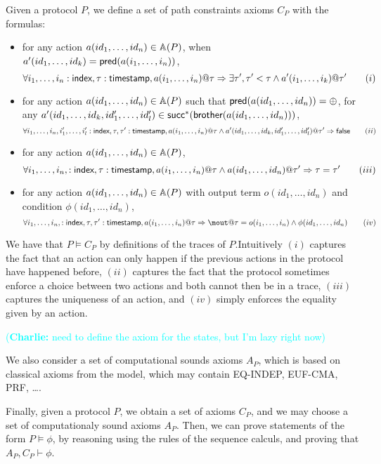 \documentclass[a4paper]{article}
\theoremstyle{remark}
\newcommand{\charlie}[1]{\textcolor{cyan}{(\textbf{Charlie:} #1)}}
\begin{document}
Given a protocol $P$, we define a set of path constraints axioms $C_P$ with the formulas:
\begin{itemize}
\item for any action $a(id_1,\dots,id_n) \in \mathbb{A}(P)$, when $a'(id_1,\dots,id_k) = \textsf{pred} (a(i_1,\dots,i_n))$,
  \[\forall i_1, \dots, i_n:\textsf{index}, \tau:\textsf{timestamp}, a(i_1,\dots,i_n)@\tau \Rightarrow \exists \tau', \tau'< \tau \wedge a'(i_1,\dots,i_k)@\tau' \qquad (i) \]
\item for any action $a(id_1,\dots,id_n) \in \mathbb{A}(P)$ such that $\textsf{pred} (a(id_1,\dots,id_n)) =
  \oplus$, for any $a'(id_1,\dots,id_k,id'_1,\dots, id'_l) \in \textsf{succ}^*( \textsf{brother} (a(id_1,\dots,id_n)))$,
  \[\forall i_1, \dots, i_n, i'_1,\dots, i'_l:\textsf{index}, \tau,\tau':\textsf{timestamp}, a(i_1,\dots,i_n)@\tau \wedge a'(id_1,\dots,id_k,id'_1,\dots, id'_l)@\tau' \Rightarrow \textsf{false}   \qquad (ii) \]
\item for any action $a(id_1,\dots,id_n) \in \mathbb{A}(P)$,
  \[\forall i_1, \dots, i_n, :\textsf{index}, \tau:\textsf{timestamp}, a(i_1,\dots,i_n)@\tau \wedge a(id_1,\dots,id_n)@\tau' \Rightarrow \tau=\tau'  \qquad (iii)\]
\item for any action $a(id_1,\dots,id_n) \in \mathbb{A}(P)$ with output term $o(id_1,\dots,id_n)$ and condition $\phi(id_1,\dots,id_n)$,
  \[\forall i_1, \dots, i_n, :\idx, \tau,\tau':\timestamp, a(i_1,\dots,i_n)@\tau \Rightarrow \mout@\tau = o(i_1,\dots,i_n) \wedge \phi(id_1,\dots,id_n)   \qquad (iv)\]
\end{itemize}

We have that $ P\models C_P$ by definitions of the traces of $P$.Intuitively $(i)$ captures the fact that an action can only happen if the previous actions in the protocol have happened before, $(ii)$ captures the fact that the protocol sometimes enforce a choice between two actions and both cannot then be in a trace, $(iii)$ captures the uniqueness of an action, and $(iv)$ simply enforces the equality given by an action.

\charlie{need to define the axiom for the states, but I'm lazy right now}


We also consider a set of computational sounds axioms $A_P$, which is based on classical axioms from the \BC model, which may contain EQ-INDEP, EUF-CMA, PRF, \dots.

Finally, given a protocol $P$, we obtain a set of axioms $C_P$, and we may choose a set of computationaly sound axioms $A_P$.
Then, we can prove statements of the form $ P \models \phi$, by reasoning using the rules of the sequence calculs, and proving that $A_P,C_P \vdash \phi$.
\end{document}
